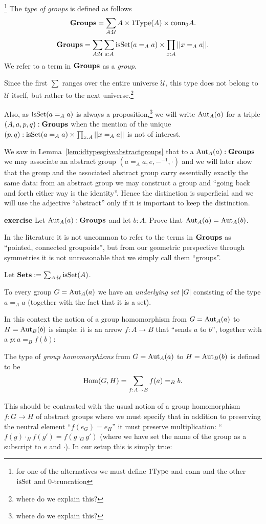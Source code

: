 \begin{definition}\footnote{for one of the alternatives we must define $\mathrm{1Type}$ and $\mathrm{conn}$ and the other  $\mathrm{isSet}$ and $0$-truncation}
  The {\em type of groups} is defined as follows
$$\mathbf{Groups}=\sum_{A:\mathcal U}A\times\mathrm{1Type}(A)\times \mathrm{conn}_0A.$$
$$\mathbf{Groups}=\sum_{A:\mathcal U}\sum_{a:A}\mathrm{isSet}(a=_Aa)\times\prod_{x:A}||x=_Aa||.$$
We refer to a term in $\mathbf{Groups}$ as a {\em group}.
\end{definition}
\begin{remark}
  Since the first $\sum$ ranges over the entire universe $\mathcal U$, this type does not belong to $\mathcal U$ itself, but rather to the next universe.\footnote{where do we explain this?}  

Also, as $\mathrm{isSet}(a=_Aa)$ is always a proposition,\footnote{where do we explain this?}   we will write $\mathrm{Aut}_A(a)$ for a triple $(A,a,p,q):\mathbf{Groups}$ when the mention of the unique $(p,q):\mathrm{isSet}(a=_Aa)\times\prod_{x:A}||x=_Aa||$ is not of interest.

We saw in Lemma~\ref{lem:idtypesgiveabstractgroups} that to a $\mathrm{Aut}_A(a):\mathbf{Groups}$ we may associate an abstract group $(a=_Aa,e,{-}^{-1},\cdot)$ and we will later show that the group and the associated abstract group carry essentially exactly the same data: from an abstract group we may construct a group and ``going back and forth either way is the identity''.
Hence the distinction is superficial and we will use the adjective ``abstract'' only if it is important to keep the distinction.
\end{remark}

{\bf exercise} Let $\mathrm{Aut}_A(a):\mathbf{Groups}$ and let $b:A$.  Prove that $\mathrm{Aut}_A(a)=\mathrm{Aut}_A(b)$.

\begin{remark}
  In the literature it is not uncommon to refer to the terms in $\mathbf{Groups}$ as ``pointed, connected groupoids'', but from our geometric perspective through symmetries it is not unreasonable that we simply call them ``groups''.
\end{remark}

Let $\mathbf{Sets}:=\sum_{A:\mathcal U}\mathrm{isSet}(A)$.  

To every group $G=\mathrm{Aut}_A(a)$ we have an {\em underlying set} $|G|$ consisting of the type $a=_Aa$ (together with the fact that it is a set).  



In this context the notion of a group homomorphism from $G=\mathrm{Aut}_A(a)$ to $H=\mathrm{Aut}_B(b)$ is simple: it is an arrow $f:A\to B$ that ``sends $a$ to $b$'', \ie together with a $p:a=_Bf(b)$:
\begin{definition}\label{def:grouphomomorphism}
  The type of {\em group homomorphisms} from $G=\mathrm{Aut}_A(a)$ to $H=\mathrm{Aut}_B(b)$ is defined to be
$$\mathrm{Hom}(G,H)=\sum_{f:A\to B}f(a)=_Bb.
$$
\end{definition}
This should be contrasted with the usual notion of a group homomorphism $f\colon G\to H$ of abstract groups where we must specify that in addition to preserving the neutral element ``$f(e_G)=e_H$'' it must preserve multiplication: ``$f(g)\cdot_H f(g')=f(g\cdot_G g')$ (where we have set the name of the group as a subscript to $e$ and $\cdot$).  In our setup this is simply true:

